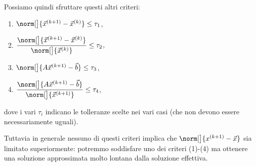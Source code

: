 Possiamo quindi sfruttare questi altri criteri:
\begin{multicols}{2}
\begin{enumerate}[label={(\arabic*)}, ref={Criterio (\arabic*)}]
    \item \label{eq:termination_crit_1} $\norm[\big]{\vec x^{(k+1)} - \vec x^{(k)}} \leq \tau_1$,
    \item \label{eq:termination_crit_2} $\displaystyle \frac{\norm[\big]{\vec x^{(k+1)} - \vec x^{(k)}}}{\norm[\big]{\vec x^{(k)}}} \leq \tau_2$,
    \item \label{eq:termination_crit_3} $\norm[\big]{A\vec x^{(k+1)} - \vec b} \leq \tau_3$,
    \item \label{eq:termination_crit_4} $\displaystyle \frac{\norm[\big]{A\vec x^{(k+1)} - \vec b}}{\norm[\big]{\vec x^{(k+1)}}} \leq \tau_4$, 
\end{enumerate} 
\end{multicols}
dove i vari $\tau_i$ indicano le tolleranze scelte nei vari casi (che non devono essere necessariamente uguali).

Tuttavia in generale nessuno di questi criteri implica che $\norm[\big]{x^{(k+1)} - \vec x}$ sia limitato superiormente: potremmo soddisfare uno dei criteri (1)-(4) ma ottenere una soluzione approssimata molto lontana dalla soluzione effettiva.

